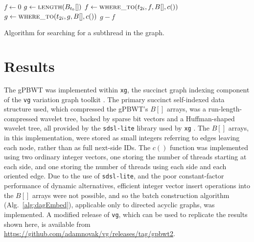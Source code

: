 \begin{algorithm}[H]
\begin{algorithmic}
  \State {}
  \State $f \gets 0$
  \State $g \gets \Call{length}{B_{t_{0}}[]}$
  \ForAll{$i$ in $[0, \Call{length}{t}/2 - 1)$}
    \State $f \gets \Call{where\_to}{t_{2i}, f, B[], c()}$
    \State $g \gets \Call{where\_to}{t_{2i}, g, B[], c()}$
    	\State {}
    \EndIf
  \EndFor
  \State \Return $g - f$
\EndFunction
\end{algorithmic}
\caption[Algorithm for searching for a subthread in the graph]{Algorithm for searching for a subthread in the graph.}
\label{alg:subthreadSearch}
\end{algorithm}


\section{Results}

The gPBWT was implemented within \texttt{xg}, the succinct graph indexing component of the \texttt{vg} variation graph toolkit \cite{garrison2016vg}. The primary succinct self-indexed data structure used, which compressed the gPBWT's $B[]$ arrays, was a run-length-compressed wavelet tree, backed by sparse bit vectors and a Huffman-shaped wavelet tree, all provided by the \texttt{sdsl-lite} library used by \texttt{xg} \cite{gog2014theory}. The $B[]$ arrays, in this implementation, were stored as small integers referring to edges leaving each node, rather than as full next-side IDs. The $c()$ function was implemented using two ordinary integer vectors, one storing the number of threads starting at each side, and one storing the number of threads using each side and each oriented edge. Due to the use of \texttt{sdsl-lite}, and the poor constant-factor performance of dynamic alternatives, efficient integer vector insert operations into the $B[]$ arrays were not possible, and so the batch construction algorithm (Alg.~\ref{alg:dagEmbed}), applicable only to directed acyclic graphs, was implemented. A modified release of \texttt{vg}, which can be used to replicate the results shown here, is available from \url{https://github.com/adamnovak/vg/releases/tag/gpbwt2}.

